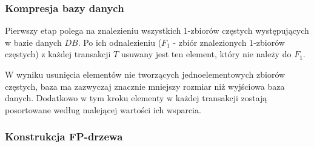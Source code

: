 \subsubsection{Kompresja bazy danych}
Pierwszy etap polega na znalezieniu wszystkich $1$-zbiorów częstych występujących w bazie danych $DB$. Po ich odnalezieniu ($F_1$ - zbiór znalezionych $1$-zbiorów częstych) z każdej transakcji $T$ usuwany jest ten element, który nie należy do $F_1$. 

W wyniku usunięcia elementów nie tworzących jednoelementowych zbiorów częstych, baza ma zazwyczaj znacznie mniejszy rozmiar niż wyjściowa baza danych. Dodatkowo w tym kroku elementy w każdej transakcji zostają posortowane według malejącej wartości ich wsparcia.

\subsubsection{Konstrukcja FP-drzewa}\label{fptree:construction}

